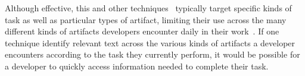 Although effective, this and other techniques~\cite{Lotufo2012, Ponzanelli2014, nadi2020} typically
target specific kinds of task as well as particular types of artifact, limiting their use across the
many different kinds of artifacts developers encounter
daily in their work~\cite{Meyer2017, meyer2019}.
If one technique identify relevant text across the various kinds
of artifacts a developer encounters according to the task they currently perform,
it would be possible for a
developer to quickly access information needed 
to complete their task.





